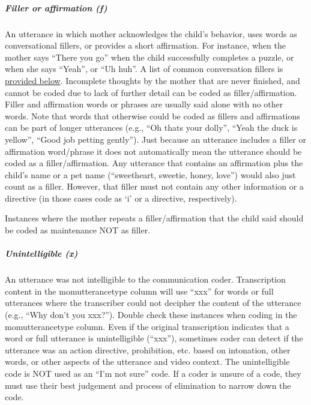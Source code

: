 \documentclass[
  12pt,
]{book}
\begin{document}
\hypertarget{filler_affirmation}{%
\subparagraph*{Filler or affirmation (f)}\label{filler_affirmation}}

An utterance in which mother acknowledges the child's behavior, uses words as conversational fillers, or provides a short affirmation. For instance, when the mother says ``There you go'' when the child successfully completes a puzzle, or when she says ``Yeah'', or ``Uh huh''. A list of common conversation fillers is \protect\hyperlink{filler_words}{provided below}.
Incomplete thoughts by the mother that are never finished, and cannot be coded due to lack of further detail can be coded as filler/affirmation.
Filler and affirmation words or phrases are usually said alone with no other words. Note that words that otherwise could be coded as fillers and affirmations can be part of longer utterances (e.g., ``Oh thats your dolly'', ``Yeah the duck is yellow'', ``Good job petting gently''). Just because an utterance includes a filler or affirmation word/phrase it does not automatically mean the utterance should be coded as a filler/affirmation.
Any utterance that contains an affirmation plus the child's name or a pet name (``sweetheart, sweetie, honey, love'') would also just count as a filler. However, that filler must not contain any other information or a directive (in those cases code as `i' or a directive, respectively).

Instances where the mother repeats a filler/affirmation that the child said should be coded as maintenance NOT as filler.

\hypertarget{unintelligible_mom}{%
\subparagraph*{Unintelligible (x)}\label{unintelligible_mom}}

An utterance was not intelligible to the communication coder.
Transcription content in the momutterancetype column will use ``xxx'' for words or full utterances where the transcriber could not decipher the content of the utterance (e.g., ``Why don't you xxx?''). Double check these instances when coding in the momutterancetype column. Even if the original transcription indicates that a word or full utterance is unintelligible (``xxx''), sometimes coder can detect if the utterance was an action directive, prohibition, etc. based on intonation, other words, or other aspects of the utterance and video context.
The unintelligible code is NOT used as an ``I'm not sure'' code. If a coder is unsure of a code, they must use their best judgement and process of elimination to narrow down the code.
\end{document}
